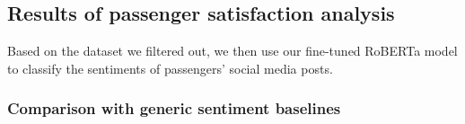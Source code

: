 \documentclass[a4paper,fleqn,12pt]{cas-sc}
\begin{document}




\subsection{Results of passenger satisfaction analysis}
Based on the dataset we filtered out, we then use our fine-tuned RoBERTa model to classify the sentiments of passengers' social media posts.
\subsubsection{Comparison with generic sentiment baselines}
\end{document}

